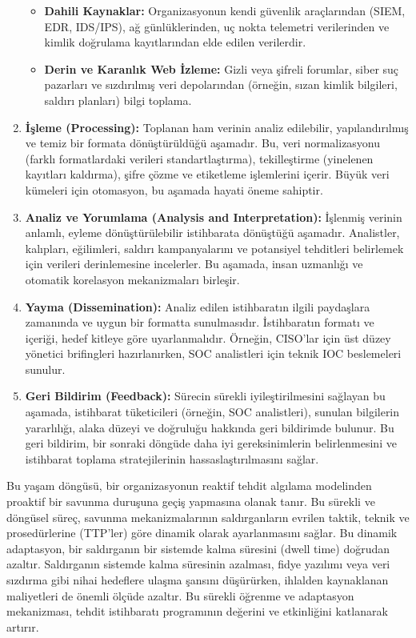 \begin{enumerate}
\begin{itemize}
        \item \textbf{Dahili Kaynaklar:} Organizasyonun kendi güvenlik araçlarından (SIEM, EDR, IDS/IPS), ağ günlüklerinden, uç nokta telemetri verilerinden ve kimlik doğrulama kayıtlarından elde edilen verilerdir.
        \item \textbf{Derin ve Karanlık Web İzleme:} Gizli veya şifreli forumlar, siber suç pazarları ve sızdırılmış veri depolarından (örneğin, sızan kimlik bilgileri, saldırı planları) bilgi toplama.
    \end{itemize}
    \item \textbf{İşleme (Processing):} Toplanan ham verinin analiz edilebilir, yapılandırılmış ve temiz bir formata dönüştürüldüğü aşamadır. Bu, veri normalizasyonu (farklı formatlardaki verileri standartlaştırma), tekilleştirme (yinelenen kayıtları kaldırma), şifre çözme ve etiketleme işlemlerini içerir. Büyük veri kümeleri için otomasyon, bu aşamada hayati öneme sahiptir.
    \item \textbf{Analiz ve Yorumlama (Analysis and Interpretation):} İşlenmiş verinin anlamlı, eyleme dönüştürülebilir istihbarata dönüştüğü aşamadır. Analistler, kalıpları, eğilimleri, saldırı kampanyalarını ve potansiyel tehditleri belirlemek için verileri derinlemesine incelerler. Bu aşamada, insan uzmanlığı ve otomatik korelasyon mekanizmaları birleşir.
    \item \textbf{Yayma (Dissemination):} Analiz edilen istihbaratın ilgili paydaşlara zamanında ve uygun bir formatta sunulmasıdır. İstihbaratın formatı ve içeriği, hedef kitleye göre uyarlanmalıdır. Örneğin, CISO'lar için üst düzey yönetici brifingleri hazırlanırken, SOC analistleri için teknik IOC beslemeleri sunulur.
    \item \textbf{Geri Bildirim (Feedback):} Sürecin sürekli iyileştirilmesini sağlayan bu aşamada, istihbarat tüketicileri (örneğin, SOC analistleri), sunulan bilgilerin yararlılığı, alaka düzeyi ve doğruluğu hakkında geri bildirimde bulunur. Bu geri bildirim, bir sonraki döngüde daha iyi gereksinimlerin belirlenmesini ve istihbarat toplama stratejilerinin hassaslaştırılmasını sağlar.
\end{enumerate}

Bu yaşam döngüsü, bir organizasyonun reaktif tehdit algılama modelinden proaktif bir savunma duruşuna geçiş yapmasına olanak tanır. Bu sürekli ve döngüsel süreç, savunma mekanizmalarının saldırganların evrilen taktik, teknik ve prosedürlerine (TTP'ler) göre dinamik olarak ayarlanmasını sağlar. Bu dinamik adaptasyon, bir saldırganın bir sistemde kalma süresini (dwell time) doğrudan azaltır. Saldırganın sistemde kalma süresinin azalması, fidye yazılımı veya veri sızdırma gibi nihai hedeflere ulaşma şansını düşürürken, ihlalden kaynaklanan maliyetleri de önemli ölçüde azaltır. Bu sürekli öğrenme ve adaptasyon mekanizması, tehdit istihbaratı programının değerini ve etkinliğini katlanarak artırır.


